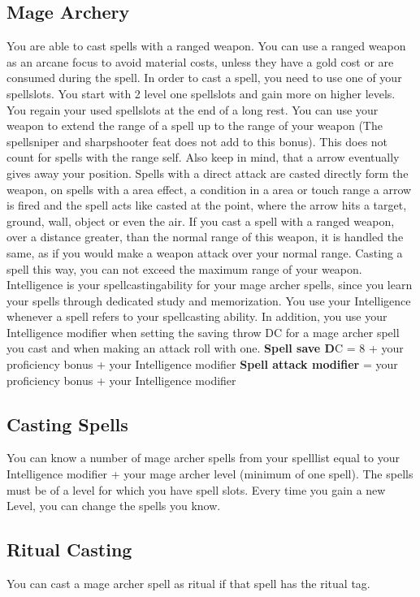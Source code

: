 \documentclass[a4paper,10pt,twoside,twocolumn, bg=print]{dndbook} %
\begin{document}
		\subsection{Mage Archery}
			You are able to cast spells with a ranged weapon. You can use a ranged weapon as an arcane focus to avoid material costs, unless they have a gold cost or are consumed during the spell. In order to cast a spell, you need to use one of your spellslots. You start with 2 level one spellslots and gain more on higher levels. You regain your used spellslots at the end of a long rest. You can use your weapon to extend the range of a spell up to the range of your weapon (The spellsniper and sharpshooter feat does not add to this bonus). This does not count for spells with the range self. Also keep in mind, that a arrow eventually gives away your position. Spells with a direct attack are casted directly form the weapon, on spells with a area effect, a condition in a area or touch range a arrow is fired and the spell acts like casted at the point, where the arrow hits a target, ground, wall, object or even the air. If you cast a spell with a ranged weapon, over a distance greater, than the normal range of this weapon, it is handled the same, as if you would make a weapon attack over your normal range. Casting a spell this way, you can not exceed the maximum range of your weapon. Intelligence is your spellcastingability for your mage archer spells, since you learn your spells through dedicated study and memorization. You use your Intelligence whenever a spell refers to your spellcasting ability. In addition, you use your Intelligence modifier when setting the saving throw DC for a mage archer spell you cast and when making an attack roll with one.\linebreak
			\textbf{Spell save D}C = 8 + your proficiency bonus + your Intelligence modifier\linebreak
			\textbf{Spell attack modifier} = your proficiency bonus + your Intelligence modifier\linebreak
		\subsection{Casting Spells}
			You can know a number of mage archer spells from your spelllist equal to your Intelligence modifier + your mage archer level (minimum of one spell). The spells must be of a level for which you have spell slots. Every time you gain a new Level, you can change the spells you know.
		\subsection{Ritual Casting}
			You can cast a mage archer spell as ritual if that spell has the ritual tag.
\end{document}
